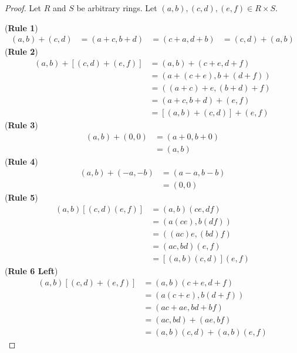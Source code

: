 \begin{proof}
    Let $R$ and $S$ be arbitrary rings.
    Let $(a, b), (c, d), (e, f) \in R \times S$.

    (\textbf{Rule 1})
    \begin{align*}
        (a, b) + (c, d) &= (a + c, b + d)
                        &= (c + a, d + b)
                        &= (c, d) + (a, b)
    \end{align*}
    (\textbf{Rule 2})
    \begin{align*}
        (a, b) + [(c, d) + (e, f)]
            &= (a, b) + (c + e, d + f) \\
            &= (a + (c + e), b + (d + f)) \\
            &= ((a + c) + e, (b + d) + f) \\
            &= (a + c, b + d) + (e, f) \\
            &= [(a, b) + (c, d)] + (e, f)
    \end{align*}
    (\textbf{Rule 3})
    \begin{align*}
        (a, b) + (0, 0) &= (a + 0, b + 0) \\
                        &= (a, b)
    \end{align*}
    (\textbf{Rule 4})
    \begin{align*}
        (a, b) + (-a, -b) &= (a - a, b - b) \\
                          &= (0, 0)
    \end{align*}
    (\textbf{Rule 5})
    \begin{align*}
        (a, b) [(c, d) (e, f)] &= (a, b)(ce, df) \\
                               &= (a(ce), b(df)) \\
                               &= ((ac)e, (bd)f) \\
                               &= (ac, bd)(e, f) \\
                               &= [(a, b)(c, d)](e, f)
    \end{align*}
    (\textbf{Rule 6 Left})
    \begin{align*}
        (a, b)[(c, d) + (e, f)] &= (a, b)(c + e, d + f) \\
                                &= (a(c + e), b(d + f)) \\
                                &= (ac + ae, bd + bf) \\
                                &= (ac, bd) + (ae, bf) \\
                                &= (a, b)(c, d) + (a, b)(e, f)

\end{align*}
\end{proof}
